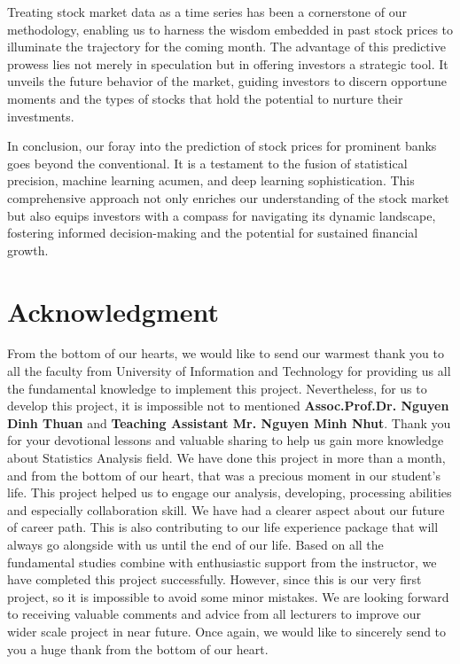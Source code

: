 \documentclass{ieeeojies}
\begin{document}
Treating stock market data as a time series has been a cornerstone of our methodology, enabling us to harness the wisdom embedded in past stock prices to illuminate the trajectory for the coming month. The advantage of this predictive prowess lies not merely in speculation but in offering investors a strategic tool. It unveils the future behavior of the market, guiding investors to discern opportune moments and the types of stocks that hold the potential to nurture their investments.

In conclusion, our foray into the prediction of stock prices for prominent banks goes beyond the conventional. It is a testament to the fusion of statistical precision, machine learning acumen, and deep learning sophistication. This comprehensive approach not only enriches our understanding of the stock market but also equips investors with a compass for navigating its dynamic landscape, fostering informed decision-making and the potential for sustained financial growth.


\section*{Acknowledgment}
From the bottom of our hearts, we would like to send our warmest thank you to all the faculty from University of Information and Technology for providing us all the fundamental knowledge to implement this project. Nevertheless, for us to develop this project, it is impossible not to mentioned \textbf{Assoc.Prof.Dr. Nguyen Dinh Thuan} and \textbf{Teaching Assistant Mr. Nguyen Minh Nhut}. Thank you for your devotional lessons and valuable sharing to help us gain more knowledge about Statistics Analysis field. We have done this project in more than a month, and from the bottom of our heart, that was a precious moment in our student’s life. This project helped us to engage our analysis, developing, processing abilities and especially collaboration skill. We have had a clearer aspect about our future of career path. This is also contributing to our life experience package that will always go alongside with us until the end of our life.
Based on all the fundamental studies combine with enthusiastic support from the instructor, we have completed this project successfully. However, since this is our very first project, so it is impossible to avoid some minor mistakes. We are looking forward to receiving valuable comments and advice from all lecturers to improve our wider scale project in near future.
Once again, we would like to sincerely send to you a huge thank from the bottom of our heart.
\end{document}
